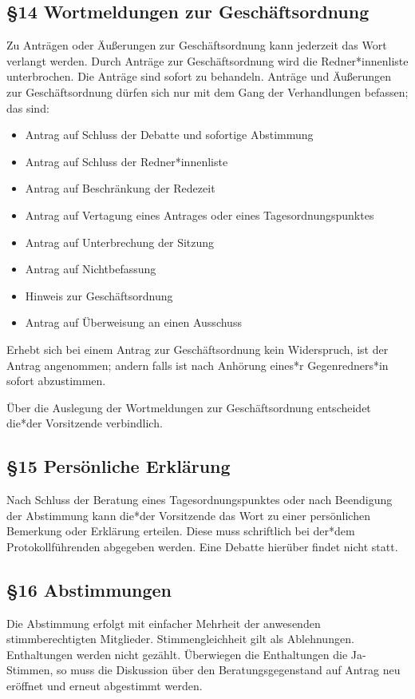 \documentclass[12pt]{report}
\begin{document}
\begin{flushleft}
\subsection*{§14 Wortmeldungen zur Geschäftsordnung}
Zu Anträgen oder Äußerungen zur Geschäftsordnung kann jederzeit das Wort verlangt werden.
Durch Anträge zur Geschäftsordnung wird die Redner*innenliste unterbrochen. Die Anträge sind sofort zu
behandeln. Anträge und Äußerungen zur Geschäftsordnung dürfen sich nur mit dem Gang der Verhandlungen
befassen; das sind:

\begin{itemize}
  \item Antrag auf Schluss der Debatte und sofortige Abstimmung
  \item Antrag auf Schluss der Redner*innenliste
  \item Antrag auf Beschränkung der Redezeit
  \item Antrag auf Vertagung eines Antrages oder eines Tagesordnungspunktes
  \item Antrag auf Unterbrechung der Sitzung
  \item Antrag auf Nichtbefassung
  \item Hinweis zur Geschäftsordnung
  \item Antrag auf Überweisung an einen Ausschuss
\end{itemize}

Erhebt sich bei einem Antrag zur Geschäftsordnung kein Widerspruch, ist der Antrag angenommen; andern
falls ist nach Anhörung eines*r Gegenredners*in sofort abzustimmen.

Über die Auslegung der Wortmeldungen zur Geschäftsordnung entscheidet die*der Vorsitzende verbindlich.


\subsection*{§15 Persönliche Erklärung}
Nach Schluss der Beratung eines Tagesordnungspunktes oder nach Beendigung der Abstimmung kann die*der
Vorsitzende das Wort zu einer persönlichen Bemerkung oder Erklärung erteilen. Diese muss schriftlich bei
der*dem Protokollführenden abgegeben werden. Eine Debatte hierüber findet nicht statt.
\subsection*{§16 Abstimmungen}
Die Abstimmung erfolgt mit einfacher Mehrheit der anwesenden stimmberechtigten Mitglieder.
Stimmengleichheit gilt als Ablehnungen. Enthaltungen werden nicht gezählt. Überwiegen die Enthaltungen die 
Ja-Stimmen, so muss die Diskussion über den Beratungsgegenstand auf Antrag neu eröffnet und erneut
abgestimmt werden.


\end{flushleft}
\end{document}
